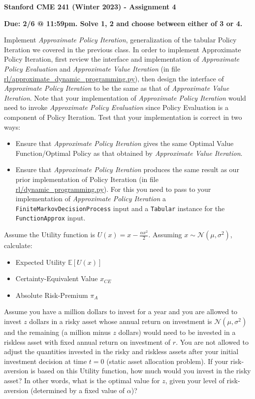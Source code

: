 \documentclass[12pt]{exam}
\begin{document}
\begin{center}
{\large {\bf Stanford CME 241 (Winter 2023) - Assignment 4}}
\end{center}
 
 {\large{\bf Due: 2/6 @ 11:59pm. Solve 1, 2 and choose between either of 3 or 4.}}
\begin{questions}
	
\question Implement {\em Approximate Policy Iteration}, generalization of the tabular Policy Iteration we covered in the previous class. In order to implement Approximate Policy Iteration, first review the interface and implementation of {\em Approximate Policy Evaluation} and {\em Approximate Value Iteration} (in file \href{https://github.com/TikhonJelvis/RL-book/blob/master/rl/approximate_dynamic_programming.py}{rl\//approximate\_dynamic\_programming.py}), then design the interface of {\em Approximate Policy Iteration} to be the same as that of {\em Approximate Value Iteration}. Note that your implementation of {\em Approximate Policy Iteration} would need to invoke {\em Approximate Policy Evaluation} since Policy Evaluation is a component of Policy Iteration. Test that your implementation is correct in two ways:
	\begin{itemize}
		\item Ensure that {\em Approximate Policy Iteration} gives the same Optimal Value Function/Optimal Policy as that obtained by {\em Approximate Value Iteration}.
		\item Ensure that {\em Approximate Policy Iteration} produces the same result as our prior implementation of Policy Iteration (in file \href{https://github.com/TikhonJelvis/RL-book/blob/master/rl/dynamic_programming.py}{rl\//dynamic\_programming.py}). For this you need to pass to your implementation of {\em Approximate Policy Iteration} a \lstinline{FiniteMarkovDecisionProcess} input and a \lstinline{Tabular} instance for the \lstinline{FunctionApprox} input.
	\end{itemize}
	
	
\question Assume the Utility function is $U(x) = x - \frac {\alpha x^2} 2$. Assuming $x \sim \mathcal{N}(\mu, \sigma^2)$, calculate:
\begin{itemize}
\item Expected Utility $\mathbb{E}[U(x)]$
\item Certainty-Equivalent Value $x_{CE}$
\item Absolute Risk-Premium $\pi_A$	
\end{itemize}
Assume you have a million dollars to invest for a year and you are allowed to invest $z$ dollars in a risky asset whose annual return on investment is $\mathcal{N}(\mu, \sigma^2)$ and the remaining (a million minus $z$ dollars) would need to be invested in a riskless asset with fixed annual return on investment of $r$. You are not allowed to adjust the quantities invested in the risky and riskless assets after your initial investment decision at time $t=0$ (static asset allocation problem). If your risk-aversion is based on this Utility function, how much would you invest in the risky asset? In other words, what is the optimal value for $z$, given your level of risk-aversion (determined by a fixed value of $\alpha$)?


\end{questions}
\end{document}
